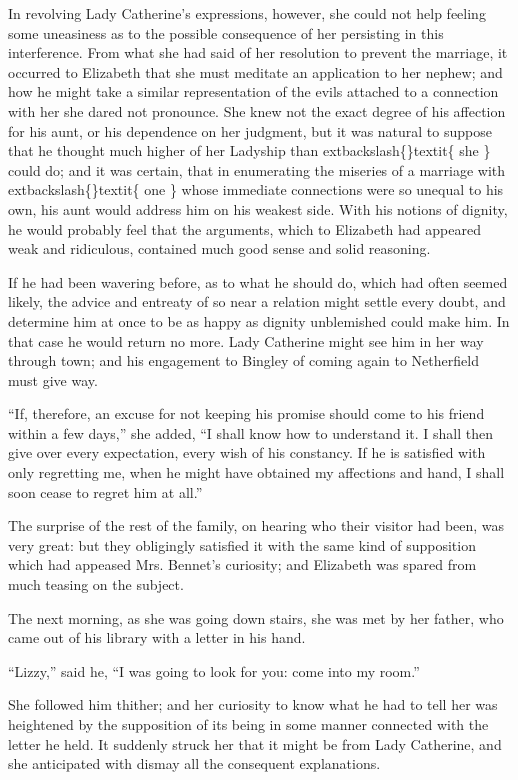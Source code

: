 \documentclass[10pt]{book}
\begin{document}
   In revolving Lady Catherine’s expressions, however, she could not help
feeling some uneasiness as to the possible consequence of her persisting
in this interference. From what she had said of her resolution to
prevent the marriage, it occurred to Elizabeth that she must meditate an
application to her nephew; and how he might take a similar
representation of the evils attached to a connection with her she dared
not pronounce. She knew not the exact degree of his affection for his
aunt, or his dependence on her judgment, but it was natural to suppose
that he thought much higher of her Ladyship than
   	extbackslash\{\}textit\{
    she
   \}
   could do; and it
was certain, that in enumerating the miseries of a marriage with
   	extbackslash\{\}textit\{
    one
   \}
   whose immediate connections were so unequal to his own, his aunt would
address him on his weakest side. With his notions of dignity, he would
probably feel that the arguments, which to Elizabeth had appeared weak
and ridiculous, contained much good sense and solid reasoning.
  

   If he had been wavering before, as to what he should do, which had often
seemed likely, the advice and entreaty of so near a relation might
settle every doubt, and determine him at once to be as happy as dignity
unblemished could make him. In that case he would return no more. Lady
Catherine might see him in her way through town; and his engagement to
Bingley of coming again to Netherfield must give way.
  

   “If, therefore, an excuse for not keeping his promise should come to his
friend within a few days,” she added, “I shall know how to understand
it. I shall then give
   over every expectation, every wish of his
constancy. If he is satisfied with only regretting me, when he might
have obtained my affections and hand, I shall soon cease to regret him
at all.”
  

   The surprise of the rest of the family, on hearing who their visitor had
been, was very great: but they obligingly satisfied it with the same
kind of supposition which had appeased Mrs. Bennet’s curiosity; and
Elizabeth was spared from much teasing on the subject.
  

   The next morning, as she was going down stairs, she was met by her
father, who came out of his library with a letter in his hand.
  

   “Lizzy,” said he, “I was going to look for you: come into my room.”
  

   She followed him thither; and her curiosity to know what he had to tell
her was heightened by the supposition of its being in some manner
connected with the letter he held. It suddenly struck her that it might
be from Lady Catherine, and she anticipated with dismay all the
consequent explanations.
  
\end{document}

